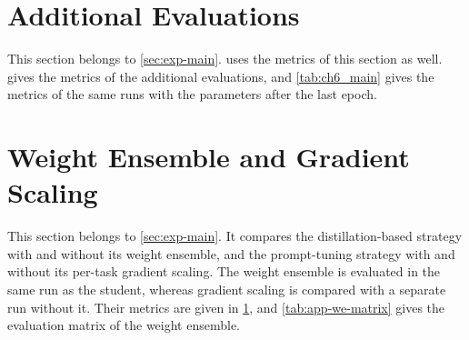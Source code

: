 \FloatBarrier
\section{Additional Evaluations}
\label{sec:app-additional}

This section belongs to \cref{sec:exp-main}.
 uses the metrics of this section as well.
 gives the metrics of the additional evaluations, and \cref{tab:ch6_main} gives the metrics of the same runs with the parameters after the last epoch.

\begin{table}[tb]
\centering
\caption[Additional evaluations]{Additional evaluations (full training split, original task order, one run each). Best validation: checkpoint with the lowest validation loss (\cref{sec:method-adaptation}). Weight ensemble: the weight ensemble of the distillation-based strategy (\cref{subsec:method-distillation}). No scaling: without the per-task gradient scaling (\cref{subsec:method-prompt}). Mean \gls{dsc}; Adapt.: Adaptation; Forg.: Final Forgetting; Ctrl.\ drop: control-task drop; Final: Final Performance; Transf.: Transfer. $\uparrow$/$\downarrow$: higher/lower is better.}
\label{tab:ch6_components}

\end{table}

\section{Weight Ensemble and Gradient Scaling}
\label{sec:exp-components}
This section belongs to \cref{sec:exp-main}.
It compares the distillation-based strategy with and without its weight ensemble, and the prompt-tuning strategy with and without its per-task gradient scaling.
The weight ensemble is evaluated in the same run as the student, whereas gradient scaling is compared with a separate run without it.
Their metrics are given in \cref{sec:app-additional}, and \cref{tab:app-we-matrix} gives the evaluation matrix of the weight ensemble.

